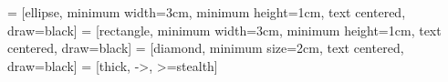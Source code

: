 



 = [ellipse, minimum width=3cm, minimum height=1cm, text centered, draw=black] %
 = [rectangle, minimum width=3cm, minimum height=1cm, text centered, draw=black] %
 = [diamond, minimum size=2cm, text centered, draw=black] %
 = [thick, ->, >=stealth] %